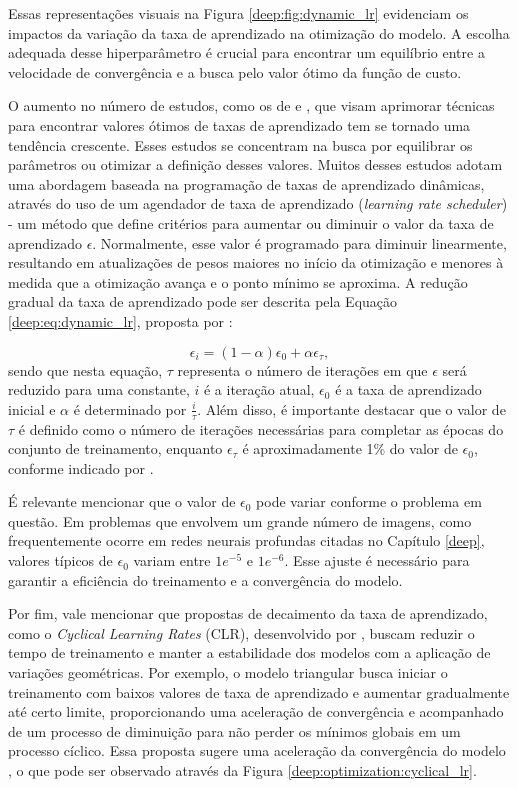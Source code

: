 Essas representações visuais na Figura \ref{deep:fig:dynamic_lr} evidenciam os impactos da variação da taxa de aprendizado na otimização do modelo. A escolha adequada desse hiperparâmetro é crucial para encontrar um equilíbrio entre a velocidade de convergência e a busca pelo valor ótimo da função de custo.

O aumento no número de estudos, como os de \cite{Tang2021AnPump, Senior2013AnRecognition} e \cite{Smith2017CyclicalNetworks}, que visam aprimorar técnicas para encontrar valores ótimos de taxas de aprendizado tem se tornado uma tendência crescente. Esses estudos se concentram na busca por equilibrar os parâmetros ou otimizar a definição desses valores. Muitos desses estudos adotam uma abordagem baseada na programação de taxas de aprendizado dinâmicas, através do uso de um agendador de taxa de aprendizado (\textit{learning rate scheduler}) - um método que define critérios para aumentar ou diminuir o valor da taxa de aprendizado $\epsilon$. Normalmente, esse valor é programado para diminuir linearmente, resultando em atualizações de pesos maiores no início da otimização e menores à medida que a otimização avança e o ponto mínimo se aproxima. A redução gradual da taxa de aprendizado pode ser descrita pela Equação \ref{deep:eq:dynamic_lr}, proposta por \cite{Goodfellow2016}:

\begin{equation}
\label{deep:eq:dynamic_lr}
\epsilon_i = (1 - \alpha) \epsilon_0 + \alpha\epsilon_\tau,
\end{equation}
sendo que nesta equação, $\tau$ representa o número de iterações em que $\epsilon$ será reduzido para uma constante, $i$ é a iteração atual, $\epsilon_0$ é a taxa de aprendizado inicial e $\alpha$ é determinado por $\frac{i}{\tau}$. Além disso, é importante destacar que o valor de $\tau$ é definido como o número de iterações necessárias para completar as épocas do conjunto de treinamento, enquanto $\epsilon_\tau$ é aproximadamente 1\% do valor de $\epsilon_0$, conforme indicado por \cite{Goodfellow2016}.

É relevante mencionar que o valor de $\epsilon_0$ pode variar conforme o problema em questão. Em problemas que envolvem um grande número de imagens, como frequentemente ocorre em redes neurais profundas citadas no Capítulo \ref{deep}, valores típicos de $\epsilon_0$ variam entre $1e^{-5}$ e $1e^{-6}$. Esse ajuste é necessário para garantir a eficiência do treinamento e a convergência do modelo.

Por fim, vale mencionar que propostas de decaimento da taxa de aprendizado, como o \textit{Cyclical Learning Rates} (CLR), desenvolvido por \cite{Smith2017CyclicalNetworks}, buscam reduzir o tempo de treinamento e manter a estabilidade dos modelos com a aplicação de variações geométricas. Por exemplo, o modelo triangular busca iniciar o treinamento com baixos valores de taxa de aprendizado e aumentar gradualmente até certo limite, proporcionando uma aceleração de convergência e acompanhado de um processo de diminuição para não perder os mínimos globais em um processo cíclico. Essa proposta sugere uma aceleração da convergência do modelo \citep{Smith2017CyclicalNetworks}, o que pode ser observado através da Figura \ref{deep:optimization:cyclical_lr}.

